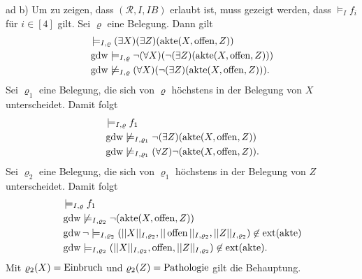 \documentclass[12pt,a4paper]{amsart}
\begin{document}
\medskip

ad b) Um zu zeigen, dass $(\mathcal{R},I,IB)$ erlaubt ist, muss gezeigt werden, dass $\models_If_i$ für $i\in[4]$ gilt. Sei $\varrho$ eine Belegung.
Dann gilt
\begin{align*}
&\models_{I,\varrho}    (\exists X)(\exists Z)(\operatorname{akte}(X,\operatorname{offen},Z))\\
&\operatorname{gdw} \models_{I,\varrho}    \lnot (\forall X) (\lnot (\exists Z)(\operatorname{akte}(X,\operatorname{offen},Z)))\\
&\operatorname{gdw} \not\models_{I,\varrho}(\forall X)(\lnot(\exists Z)(\operatorname{akte}(X,\operatorname{offen},Z))).
\end{align*}
Sei $\varrho_1$ eine Belegung, die sich von $\varrho$ höchstens in der Belegung von $X$ unterscheidet. Damit folgt
\begin{align*}
&\models_{I,\varrho} f_1\\
&\operatorname{gdw}\not\models_{I,\varrho_1} \lnot (\exists Z)(\operatorname{akte}(X,\operatorname{offen},Z))\\
&\operatorname{gdw}\not\models_{I,\varrho_1} (\forall Z)\lnot (\operatorname{akte}(X,\operatorname{offen},Z)).
\end{align*}
Sei $\varrho_2$ eine Belegung, die sich von $\varrho_1$ höchstens in der Belegung von $Z$ unterscheidet. Damit folgt
\begin{align*}
&\models_{I,\varrho} f_1\\
&\operatorname{gdw}\not\models_{I,\varrho_2} \lnot (\operatorname{akte}(X,\operatorname{offen},Z))\\
&\operatorname{gdw}\lnot\models_{I,\varrho_2} (||X||_{I,\varrho_2},||\operatorname{offen}||_{I,\varrho_2},||Z||_{I,\varrho_2})\not\in\operatorname{ext}(\operatorname{akte})\\
&\operatorname{gdw}\models_{I,\varrho_2}(||X||_{I,\varrho_2},\operatorname{offen},||Z||_{I,\varrho_2})\not\in\operatorname{ext}(\operatorname{akte}).
\end{align*}
Mit $\varrho_2(X)=\operatorname{Einbruch}$ und $\varrho_2(Z)=\operatorname{Pathologie}$ gilt die Behauptung.

\medskip
\end{document}
